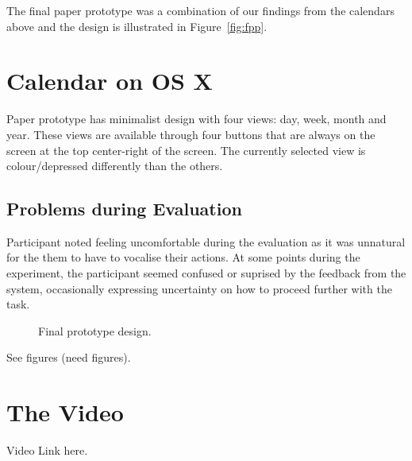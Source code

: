 \documentclass{article}
\begin{document}
The final paper prototype was a combination of our findings from the
calendars above and the design is illustrated in Figure~\ref{fig:fpp}.

\section{Calendar on OS X}

Paper prototype has minimalist design with four views: day, week, month
and year. These views are available through four buttons that are
always on the screen at the top center-right of the screen. The
currently selected view is colour/depressed differently than the
others.

\subsection{Problems during Evaluation}

Participant noted feeling uncomfortable during the evaluation as it was
unnatural for the them to have to vocalise their actions. At some points
during the experiment, the participant seemed confused or suprised by
the feedback from the system, occasionally expressing uncertainty on how
to proceed further with the task.

\begin{figure}
\centering
\vspace{-50mm}
\caption{Final prototype design.}
\label{fig:ffp}
\end{figure}


See figures (need figures).
\section{The Video}

Video Link here.

\end{document}
